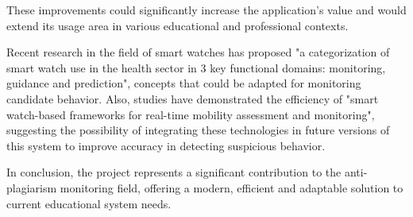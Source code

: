 \documentclass[12pt,a4paper]{article}
\begin{document}
These improvements could significantly increase the application's value and would extend its usage area in various educational and professional contexts.

Recent research in the field of smart watches has proposed "a categorization of smart watch use in the health sector in 3 key functional domains: monitoring, guidance and 
prediction"\cite{moshawrab2023value}, concepts that could be adapted for monitoring 
candidate behavior. Also, studies have demonstrated the efficiency of "smart watch-based frameworks for real-time mobility assessment and monitoring"\cite{kheirkhahan2018smartwatch}, 
suggesting the possibility of integrating these technologies in future versions of this system to 
improve accuracy in detecting suspicious behavior. \cite{brainard2018massive}

In conclusion, the project represents a significant contribution to the anti-plagiarism monitoring field, offering a modern, efficient and adaptable solution to current educational system needs.

\newpage
\printbibliography[heading=bibintoc, title={Bibliography}]
\end{document}

